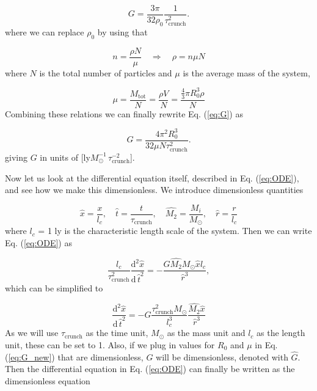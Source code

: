 \documentclass{article}
\begin{document}
\begin{multicols}{2}
\begin{equation}\label{eq:G}
	G = \frac{3\pi}{32 \rho_0} \frac{1}{\tau_{\mathrm{crunch}}^2}.
\end{equation}
where we can replace $\rho_0$ by using that

\begin{equation*}
	n = \frac{\rho N}{\mu} \quad \Rightarrow \quad \rho = n \mu N
\end{equation*}
where $N$ is the total number of particles and $\mu$ is the average mass of the system,

\begin{equation*}
	\mu = \frac{M_{\mathrm{tot}}}{N} = \frac{\rho V}{N} = \frac{\frac{4}{3} \pi R_0^3 \rho}{N}
\end{equation*}
Combining these relations we can finally rewrite Eq. (\ref{eq:G}) as 

\begin{equation}\label{eq:G_new}
	G = \frac{4 \pi^2 R_0^3}{32 \mu N \tau_{\mathrm{crunch}}^2}.
\end{equation}
giving $G$ in units of [ly$M_{\odot}^{-1} \, \tau_{\mathrm{crunch}}^{-2}$].

Now let us look at the differential equation itself, described in Eq. (\ref{eq:ODE}), and see how we make this dimensionless. We introduce dimensionless quantities

\begin{equation*}
	\hat{x} = \frac{x}{l_c}, \quad \hat{t} = \frac{t}{\tau_{\mathrm{crunch}}}, \quad \hat{M_2} = \frac{M_i}{M_{\odot}}, \quad \hat{r} = \frac{r}{l_c}
\end{equation*} 
where $l_c$ = 1 ly is the characteristic length scale of the system. Then we can write Eq. (\ref{eq:ODE}) as

\begin{equation*}
	\frac{l_c}{\tau_{\mathrm{crunch}}^2} \frac{\mathrm{d}^2 \hat{x}}{\mathrm{d} \, \hat{t}^2} = - \frac{G \hat{M_2} M_{\odot} \hat{x} l_c}{\hat{r}^3},
\end{equation*}
which can be simplified to

\begin{equation*}
	\frac{\mathrm{d}^2 \hat{x}}{\mathrm{d} \, \hat{t}^2} = - G \frac{\tau_{\mathrm{crunch}}^2 M_{\odot}}{l_c^3}  \frac{\hat{M_2} \hat{x}}{\hat{r}^3}
\end{equation*}
As we will use $\tau_{\mathrm{crunch}}$ as the time unit, $M_{\odot}$ as the mass unit and $l_c$ as the length unit, these can be set to 1. Also, if we plug in values for $R_0$ and $\mu$ in Eq. (\ref{eq:G_new}) that are dimensionless, $G$ will be dimensionless, denoted with $\hat{G}$. Then the differential equation in Eq. (\ref{eq:ODE}) can finally be written as the dimensionless equation


\end{multicols}
\end{document}
